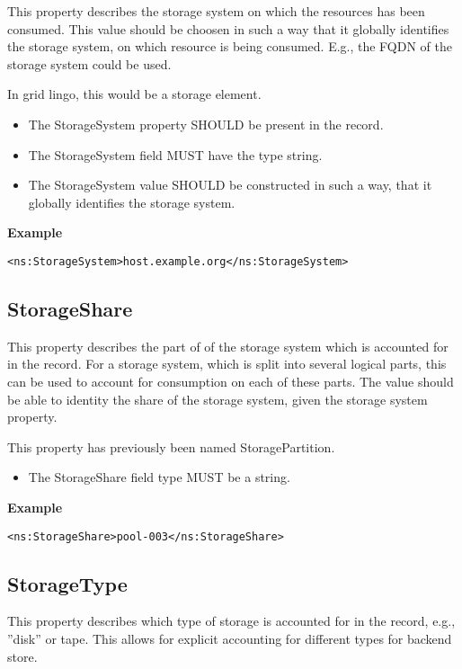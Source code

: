 This property describes the storage system on which the resources has been
consumed. This value should be choosen in such a way that it globally
identifies the storage system, on which resource is being consumed. E.g., the
FQDN of the storage system could be used.

In grid lingo, this would be a storage element.

\begin{itemize}
\item The StorageSystem property SHOULD be present in the record.
\item The StorageSystem field MUST have the type string.
\item The StorageSystem value SHOULD be constructed in such a way, that it
    globally identifies the storage system.
\end{itemize}

{\bf Example}
\begin{verbatim}
<ns:StorageSystem>host.example.org</ns:StorageSystem>
\end{verbatim}


\subsection{StorageShare}

This property describes the part of of the storage system which is accounted
for in the record. For a storage system, which is split into several logical
parts, this can be used to account for consumption on each of these parts.
The value should be able to identity the share of the storage system, given
the storage system property.

This property has previously been named StoragePartition.

\begin{itemize}
\item The StorageShare field type MUST be a string.
\end{itemize}

{\bf Example}
\begin{verbatim}
<ns:StorageShare>pool-003</ns:StorageShare>
\end{verbatim}


\subsection{StorageType}

This property describes which type of storage is accounted for in the record,
e.g., ''disk'' or tape. This allows for explicit accounting for different types for
backend store.

